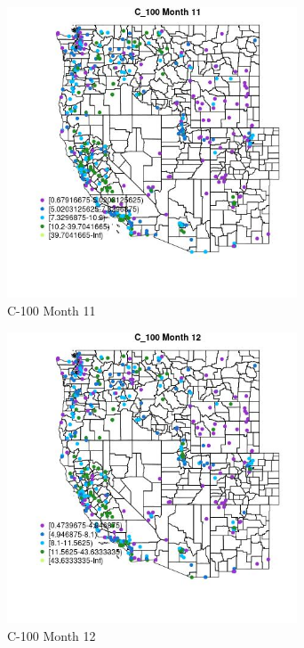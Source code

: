 \begin{figure} 
\centering  
\includegraphics[width=0.77\textwidth]{Code_Outputs/ML_input_report_ML_input_PM25_Step5_part_d_de_duplicated_aves_ML_input_MapObsMo11C_100.jpg} 
\caption{\label{fig:ML_input_report_ML_input_PM25_Step5_part_d_de_duplicated_aves_ML_inputMapObsMo11C_100}C-100 Month 11} 
\end{figure} 
 

\begin{figure} 
\centering  
\includegraphics[width=0.77\textwidth]{Code_Outputs/ML_input_report_ML_input_PM25_Step5_part_d_de_duplicated_aves_ML_input_MapObsMo12C_100.jpg} 
\caption{\label{fig:ML_input_report_ML_input_PM25_Step5_part_d_de_duplicated_aves_ML_inputMapObsMo12C_100}C-100 Month 12} 
\end{figure} 
 

